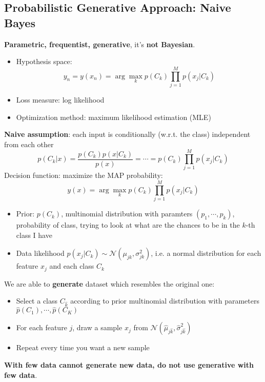\subsection{Probabilistic Generative Approach: Naive Bayes}
    \textbf{Parametric, frequentist, generative}, it's \textbf{not Bayesian}.
    \begin{itemize}
        \item Hypothesis space:
        $$y_n=y(x_n)=\arg\max_{k}p(C_k)\prod_{j=1}^Mp(x_j|C_k)$$
        \item Loss measure: log likelihood
        \item Optimization method: maximum likelihood estimation (MLE)
    \end{itemize}
    \textbf{Naive assumption}: each input is conditionally (w.r.t. the class) independent from each other
    $$p(C_k|x)=\frac{p(C_k)p(x|C_k)}{p(x)}=\cdots=p(C_k)\prod_{j=1}^Mp(x_j|C_k)$$
    Decision function: maximize the MAP probability:
    $$y(x)=\arg\max_{k}p(C_k)\prod_{j=1}^Mp(x_j|C_k)$$
    \begin{itemize}
        \item Prior: $p(C_k)$, multinomial distribution with paramters $(p_1,\cdots,p_k)$, probability of class, trying to look at what are the chances to be in the $k$-th class I have
        \item Data likelihood $p(x_j|C_k)\sim \mathcal{N}(\mu_{jk},\sigma^2_{jk})$, i.e. a normal distribution for each feature $x_j$ and each class $C_k$
    \end{itemize}
    We are able to \textbf{generate} dataset which resembles the original one:
    \begin{itemize}
        \item Select a class $C_{\hat{k}}$ according to prior multinomial distribution with parameters $\hat{p}(C_1),\cdots,\hat{p}(C_K)$
        \item For each feature $j$, draw a sample $x_j$ from $\mathcal{N}(\hat{\mu}_{j\hat{k}},\hat{\sigma}^2_{j\hat{k}})$
        \item Repeat every time you want a new sample
    \end{itemize}
    \textbf{With few data cannot generate new data, do not use generative with few data}.